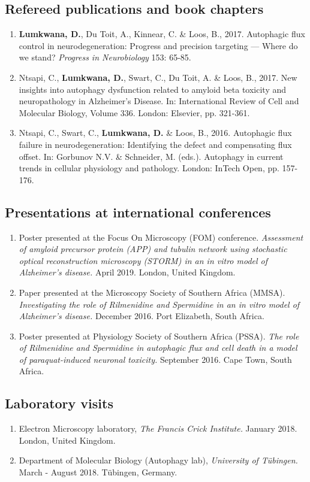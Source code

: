 \subsection*{Refereed publications and book chapters}
\begin{enumerate}
\item \textbf{Lumkwana, D.}, Du Toit, A., Kinnear, C. \& Loos, B., 2017. Autophagic flux control in neurodegeneration: Progress and precision targeting — Where do we stand? \textit{Progress in Neurobiology} 153: 65-85.
\item Ntsapi, C., \textbf{Lumkwana, D.}, Swart, C., Du Toit, A. \& Loos, B., 2017. New insights into autophagy dysfunction related to amyloid beta toxicity and neuropathology in Alzheimer’s Disease. In: International Review of Cell and Molecular Biology, Volume 336. London: Elsevier, pp. 321-361.
\item Ntsapi, C., Swart, C., \textbf{Lumkwana, D.} \& Loos, B., 2016. Autophagic flux failure in neurodegeneration: Identifying the defect and compensating flux offset. In: Gorbunov N.V. \& Schneider, M. (eds.). Autophagy in current trends in cellular physiology and pathology. London: InTech Open, pp. 157-176.
\end{enumerate}

\subsection*{Presentations at international conferences}
\begin{enumerate}
\item Poster presented at the Focus On Microscopy (FOM) conference. \textit{Assessment of amyloid precursor protein (APP) and tubulin network using stochastic optical reconstruction microscopy (STORM) in an in vitro model of Alzheimer's disease.} April 2019. London, United Kingdom.
\item Paper presented at the Microscopy Society of Southern Africa (MMSA). \textit{Investigating the role of Rilmenidine and Spermidine in an in vitro model of Alzheimer's disease.} December 2016. Port Elizabeth, South Africa.
\item Poster presented at Physiology Society of Southern Africa (PSSA). \textit{The role of Rilmenidine and Spermidine in autophagic flux and cell death in a model of paraquat-induced neuronal toxicity.} September 2016. Cape Town, South Africa.
\end{enumerate}

\subsection*{Laboratory visits}
\begin{enumerate}
\item Electron Microscopy laboratory, \textit{The Francis Crick Institute.} January 2018. \mbox{London}, United Kingdom.
\item Department of Molecular Biology (Autophagy lab), \textit{University of T{\"u}bingen.} March - August 2018. T{\"u}bingen, Germany.
\end{enumerate}
\newpage

